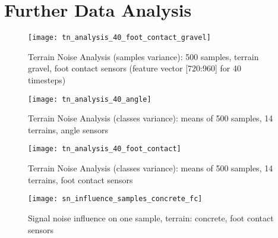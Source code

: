 \section{Further Data Analysis} \label{sec:further_data_analysis}

\begin{figure}[H]
  \centering
  \texttt{[image: tn\_analysis\_40\_foot\_contact\_gravel]}
  \caption{Terrain Noise Analysis (samples variance): 500 samples, terrain gravel, foot contact sensors (feature vector [720:960] for 40 timesteps)}
  \label{fig:tn_analysis_foot_contact_gravel}
\end{figure}

\begin{figure}[H]
  \centering
  \texttt{[image: tn\_analysis\_40\_angle]}
  \caption{Terrain Noise Analysis (classes variance): means of 500 samples, 14 terrains, angle sensors}
  \label{fig:tn_analysis_angle}
\end{figure}

\begin{figure}[H]
  \centering
  \texttt{[image: tn\_analysis\_40\_foot\_contact]}
  \caption{Terrain Noise Analysis (classes variance): means of 500 samples, 14 terrains, foot contact sensors}
  \label{fig:tn_analysis_foot_contact}
\end{figure}

\begin{figure}[H]
  \centering
  \texttt{[image: sn\_influence\_samples\_concrete\_fc]}
  \caption{Signal noise influence on one sample, terrain: concrete, foot contact sensors}
  \label{fig:sn_influence_samples_concrete_fc}
\end{figure}

%
